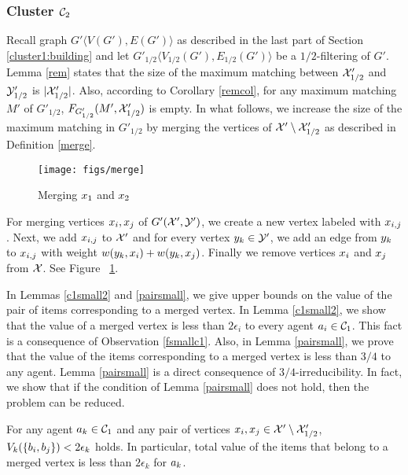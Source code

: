 \subsubsection{Cluster $\mathcal{C}_2$}
Recall graph $G' \langle V(G') , E(G') \rangle$ as described in the last part of Section \ref{cluster1:building} and let $G'_{1/2}\langle V_{1/2}(G'), E_{1/2}(G') \rangle$ be a $1/2$-filtering of $G'$. Lemma \ref{rem} states that the size of the maximum matching between $\mathcal{X}'_{1/2}$ and $\mathcal{Y}'_{1/2}$ is $|\mathcal{X}'_{1/2}|$. Also, according to Corollary \ref{remcol}, for any maximum matching $M'$ of $G'_{1/2}$, $F_{G'_{1/2}}(M',\mathcal{X}'_{1/2})$ is empty. In what follows, we increase the size of the maximum matching in  $G'_{1/2}$ by merging the vertices of $\mathcal{X}' \setminus \mathcal{X}'_{1/2}$ as described in Definition \ref{merge}.

\begin{figure}[t!]
    \centering
    \texttt{[image: figs/merge]}
    \caption{Merging $x_1$ and $x_2$}
    \label{fig:merge}
\end{figure}


\begin{definition}
\label{merge}
For merging vertices $x_i,x_j$ of $G'(\mathcal{X}',\mathcal{Y}')$, we create a new vertex labeled with $x_{i,j}$. Next, we add $x_{i,j}$ to $\mathcal{X}'$ and for every vertex $y_k \in \mathcal{Y}'$, we add an edge from $y_k$ to $x_{i,j}$ with weight $w(y_k,x_i) + w(y_k,x_j)$. Finally we remove vertices $x_i$ and $x_j$ from $\mathcal{X}$. See Figure ~\ref{fig:merge}.
\end{definition}

In Lemmas \ref{c1small2} and \ref{pairsmall}, we give upper bounds on the value of the pair of items corresponding to a merged vertex. In Lemma \ref{c1small2}, we show that the value of a merged vertex is less than $2\epsilon_i$ to every agent $a_i \in \mathcal{C}_1$. This fact is a consequence of Observation \ref{fsmallc1}. Also, in Lemma \ref{pairsmall}, we prove that the value of the items corresponding to a merged vertex is less than $3/4$ to any agent. Lemma \ref{pairsmall} is a direct consequence of $3/4$-irreducibility. In fact, we show that if the condition of Lemma \ref{pairsmall} does not hold, then the problem can be reduced. 

\begin{lemma}
\label{c1small2}
For any agent $a_k \in \mathcal{C}_1$ and any pair of vertices $x_i, x_j \in \mathcal{X}' \setminus \mathcal{X}'_{1/2}$, $V_k(\{b_i,b_j\}) < 2\epsilon_k$ holds. In particular, total value of the items that belong to a merged vertex is less than $2\epsilon_k$ for $a_k$.
\end{lemma}

